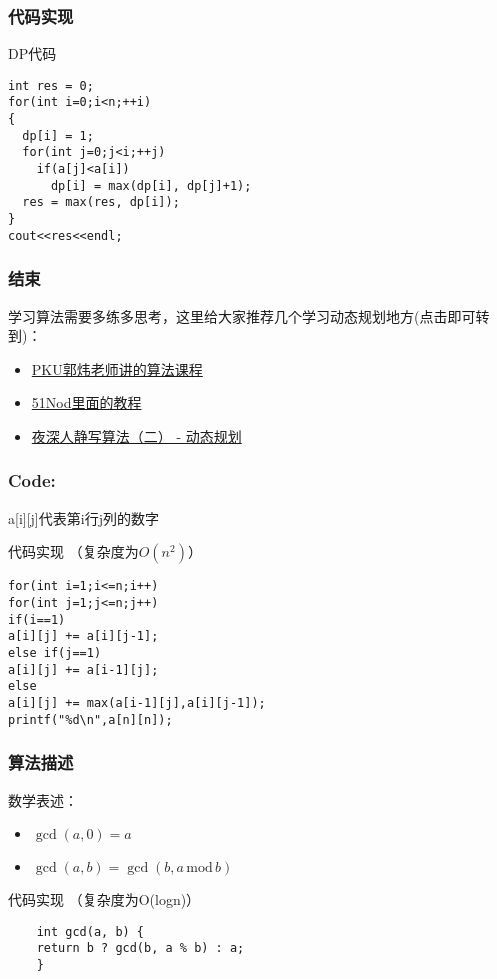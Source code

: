 \documentclass{beamer}
\begin{document}
\begin{frame}[fragile]
\frametitle{代码实现}
\begin{block}{DP代码}
	\begin{lstlisting}
int res = 0;
for(int i=0;i<n;++i)
{
  dp[i] = 1;
  for(int j=0;j<i;++j)
    if(a[j]<a[i])     
      dp[i] = max(dp[i], dp[j]+1);
  res = max(res, dp[i]);
}
cout<<res<<endl;
	\end{lstlisting}
\end{block}
\end{frame}

\begin{frame}[fragile]
\frametitle{结束}
	学习算法需要多练多思考，这里给大家推荐几个学习动态规划地方(点击即可转到)：\\
	\begin{itemize}
		\item \href{https://www.icourse163.org/learn/PKU-1001894005?tid=1205957211#/learn/content}{PKU郭炜老师讲的算法课程}
		\item \href{https://www.51nod.com/Tutorial/TutorialList.html}{51Nod里面的教程}
		\item \href{http://www.cppblog.com/menjitianya/archive/2015/10/23/212084.html}{夜深人静写算法（二） - 动态规划}
	\end{itemize}
\end{frame}


\iffalse
\begin{frame}[fragile]
\frametitle{Code:}
a[i][j]代表第i行j列的数字
\begin{block}{代码实现  （复杂度为$O(n^2)$）}
\begin{lstlisting}
for(int i=1;i<=n;i++)
for(int j=1;j<=n;j++)
if(i==1)    
a[i][j] += a[i][j-1];
else if(j==1)
a[i][j] += a[i-1][j];
else
a[i][j] += max(a[i-1][j],a[i][j-1]);
printf("%d\n",a[n][n]);
\end{lstlisting}
\end{block}
\end{frame}
\textbf{}


\begin{frame}[fragile]
\frametitle{算法描述}
数学表述：
\begin{itemize}
	\item ${\displaystyle \gcd(a,0)=a}$
	\item ${\displaystyle \gcd(a,b)=\gcd(b,a\,\mathrm {mod} \,b)} $
\end{itemize}
\begin{block}{代码实现  （复杂度为O(logn)）}
	\begin{lstlisting}
	int gcd(a, b) {
	return b ? gcd(b, a % b) : a;
	}
	\end{lstlisting}
\end{block}
\end{frame}
\end{document}
